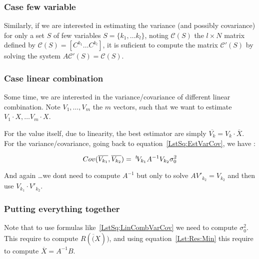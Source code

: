 \subsubsection{Case few variable}

Similarly, if we are interested in estimating the variance (and possibly covariance)  for
only a set $S$ of  few variables $S=\{k_1,\dots k_l\}$, noting  $\mathcal{C}(S)$ the  $l \times N$
matrix  defined by $\mathcal{C}(S) = [C^{k_1} \dots C^{k_l}]$,
it is suficient to compute the  matrix $ \mathcal{C}'(S)$ by
solving  the system $A \mathcal{C}'(S) = \mathcal{C}(S)$.

\subsubsection{Case linear combination}

Some time, we are interested in the variance/covariance  of  different linear combination.
Note $V_1, \dots ,V_m$ the $m$ vectors, such that  we want to estimate $V_1 \cdot X, \dots V_m \cdot X$.

For the value itself, due to linearity, the best estimator are simply $\overline{V_k} = V_k \cdot \overline X$.
For the variance/covariance, going back to equation~\ref{LstSq:EstVarCov}, we have :


\begin{equation}
	Cov(\overline{V_{k_1}},\overline{V_{k_2}})  =  \; ^{t} \! V_{k_1} A^{-1} V_{k_2}  \sigma_0^2 \label{LstSq:LinCombVarCov}
\end{equation}

And again \dots we dont need to compute $ A^{-1}$ but only to solve $A V'_{k_2}  = V_{k_2}$ and then use $V_{k_1} \cdot V'_{k_2}$.

\subsubsection{Putting everything together}

\label{LstSq:Uncer:AllTog}

Note that to use formulas like~\ref{LstSq:LinCombVarCov} we need to compute $\sigma_0^2$.  This require to compute $R(\overline(X))$,
and using equation~\ref{Lst:Res:Min} this require   to compute  $ \overline{X} =  A^{-1} B$.

